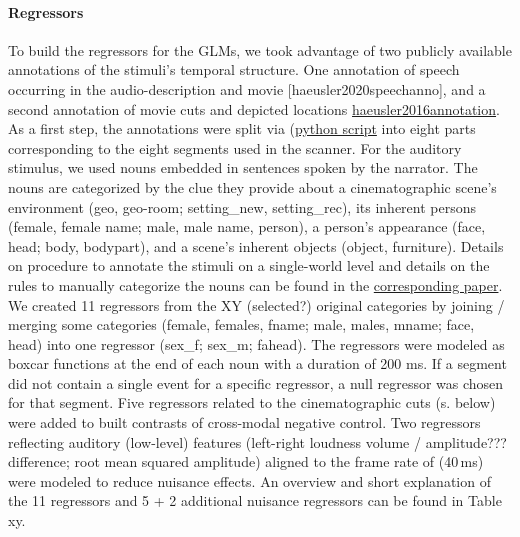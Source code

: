 \documentclass[english]{article}
\begin{document}
\paragraph{Regressors }
To build the regressors for the GLMs, we took advantage of two publicly available annotations of the stimuli's temporal structure.
One annotation of speech occurring in the audio-description and movie [haeusler2020speechanno], and a second annotation of movie cuts and depicted locations \href{https://f1000research.com/articles/5-2273}{haeusler2016annotation}.
As a first step, the annotations were split via (\href{"https://github.com/chrhaeusler/studyforrest-data-annotations/blob/master/code/researchcut2segments.py"}{python script} into eight parts corresponding to the eight segments used in the scanner.
For the auditory stimulus, we used nouns embedded in sentences spoken by the narrator. The nouns are categorized by the clue they provide about a cinematographic scene's environment  (geo, geo-room; setting\_new, setting\_rec), its inherent persons (female, female name; male, male name, person), a person's appearance (face, head; body, bodypart), and a scene's inherent objects (object, furniture).
Details on procedure to annotate the stimuli on a single-world level and details on the rules to manually categorize the nouns can be found in the \href{"https://www.overleaf.com/project/5d4ab1b759001b5db6ea2bc3"}{corresponding paper}.
We created 11 regressors from the XY (selected?) original categories by joining / merging some categories (female, females, fname; male, males, mname; face, head) into one regressor (sex\_f; sex\_m; fahead).
The regressors were modeled as boxcar functions at the end of each noun with a duration of 200 ms.
If a segment did not contain a single event for a specific regressor, a null regressor was chosen for that segment.
Five regressors related to the cinematographic cuts (s. below) were added to built contrasts of cross-modal negative control.
Two regressors reflecting auditory (low-level) features (left-right loudness volume / amplitude??? difference; root mean squared amplitude) aligned to the frame rate of (40\,ms) were modeled to reduce nuisance effects.
An overview and short explanation of the 11 regressors and 5 + 2 additional nuisance regressors can be found in Table xy.
\end{document}
